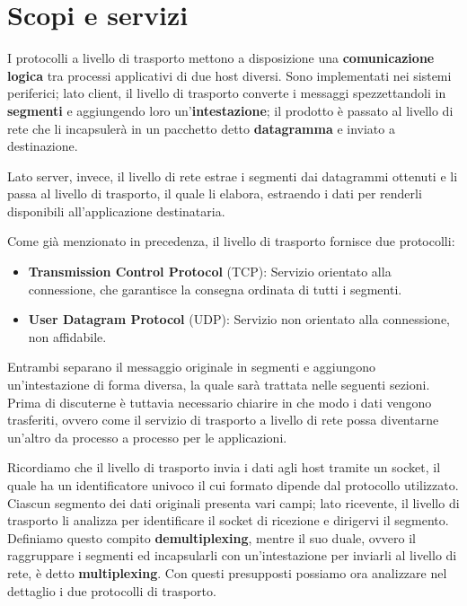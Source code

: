 \section{Scopi e servizi}
I protocolli a livello di trasporto mettono a disposizione una \textbf{comunicazione logica} tra processi applicativi di due host diversi. Sono 
implementati nei sistemi periferici; lato client, il livello di trasporto converte i messaggi spezzettandoli in \textbf{segmenti} e aggiungendo loro 
un'\textbf{intestazione}; il prodotto è passato al livello di rete che li incapsulerà in un pacchetto detto \textbf{datagramma} e inviato a destinazione.\par
Lato server, invece, il livello di rete estrae i segmenti dai datagrammi ottenuti e li passa al livello di trasporto, il quale li elabora, estraendo 
i dati per renderli disponibili all'applicazione destinataria.\newline

\noindent Come già menzionato in precedenza, il livello di trasporto fornisce due protocolli: \begin{itemize}
	\item \textbf{Transmission Control Protocol} (TCP): Servizio orientato alla connessione, che garantisce la consegna ordinata di tutti i segmenti.
	\item \textbf{User Datagram Protocol} (UDP): Servizio non orientato alla connessione, non affidabile.
\end{itemize}
\noindent Entrambi separano il messaggio originale in segmenti e aggiungono un'intestazione di forma diversa, la quale sarà trattata nelle seguenti
sezioni. Prima di discuterne è tuttavia necessario chiarire in che modo i dati vengono trasferiti, ovvero come il servizio di trasporto a livello di
rete possa diventarne un'altro da processo a processo per le applicazioni.\par
Ricordiamo che il livello di trasporto invia i dati agli host tramite un socket, il quale ha un identificatore univoco il cui formato dipende dal
protocollo utilizzato. Ciascun segmento dei dati originali presenta vari campi; lato ricevente, il livello di trasporto li analizza per identificare
il socket di ricezione e dirigervi il segmento. Definiamo questo compito \textbf{demultiplexing}, mentre il suo duale, ovvero il raggruppare i segmenti
ed incapsularli con un'intestazione per inviarli al livello di rete, è detto \textbf{multiplexing}. Con questi presupposti possiamo ora analizzare nel
dettaglio i due protocolli di trasporto.

